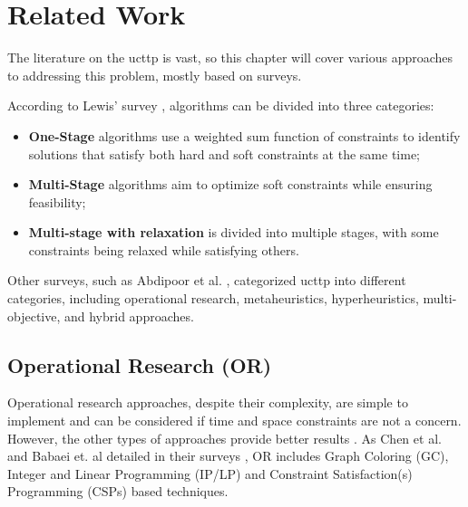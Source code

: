 
\chapter{Related Work}


\label{Related Work}

The literature on the \ac{ucttp} is vast, so this chapter will cover various approaches to addressing this problem, mostly based on surveys.

According to Lewis' survey \cite{lewis_survey_2008}, algorithms can be divided into three categories:

\begin{itemize}
	\item \textbf{One-Stage} algorithms use a weighted sum function of constraints to identify solutions that satisfy both hard and soft constraints at the same time;
	\item \textbf{Multi-Stage} algorithms aim to optimize soft constraints while ensuring feasibility;
	\item \textbf{Multi-stage with relaxation} is divided into multiple stages, with some constraints being relaxed while satisfying others.
\end{itemize}

Other surveys, such as Abdipoor et al. \cite{abdipoor_meta-heuristic_2023}, categorized \ac{ucttp} into different categories, including operational research, metaheuristics, hyperheuristics, multi-objective, and hybrid approaches.

\section{Operational Research (OR)}

Operational research approaches, despite their complexity, are simple to implement and can be considered if time and space constraints are not a concern. However, the other types of approaches provide better results \cite{babaei_survey_2015}. As Chen et al. and  Babaei et. al detailed in their surveys \cite{babaei_survey_2015, chen_survey_2021}, OR includes Graph Coloring (GC), Integer and Linear Programming (IP/LP) and Constraint Satisfaction(s) Programming (CSPs) based techniques.

